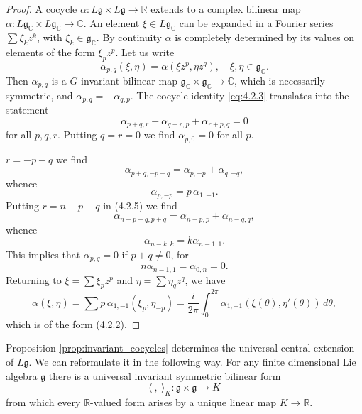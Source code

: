 \documentclass[12pt]{article}
\begin{document}
\begin{proof}
    A cocycle $\alpha : L\mathfrak{g} \times L\mathfrak{g} \to \mathbb{R}$
    extends to a complex bilinear map
    $\alpha : L\mathfrak{g}_{\mathbb{C}} \times L\mathfrak{g}_{\mathbb{C}} \to \mathbb{C}$.
    An element $\xi \in L\mathfrak{g}_{\mathbb{C}}$ can be expanded in a Fourier series
    $\sum \xi_k z^k$, with $\xi_k \in \mathfrak{g}_{\mathbb{C}}$. By continuity $\alpha$ is
    completely determined by its values on elements of the form $\xi_p z^p$.
    Let us write
    \[
        \alpha_{p,q}(\xi,\eta) = \alpha(\xi z^p, \eta z^q), \quad \xi,\eta \in \mathfrak{g}_{\mathbb{C}}.
    \]
    Then $\alpha_{p,q}$ is a $G$-invariant bilinear map
    $\mathfrak{g}_{\mathbb{C}} \times \mathfrak{g}_{\mathbb{C}} \to \mathbb{C}$, which is necessarily symmetric, and
    $\alpha_{p,q} = -\alpha_{q,p}$. The cocycle identity \eqref{eq:4.2.3} translates into the statement
    \begin{equation} \label{eq:4.2.5}
        \alpha_{p+q,r} + \alpha_{q+r,p} + \alpha_{r+p,q} = 0
    \end{equation}
    for all $p,q,r$. Putting $q=r=0$ we find $\alpha_{p,0}=0$ for all $p$.

    $r = -p-q$ we find
    \[
        \alpha_{p+q,-p-q} = \alpha_{p,-p} + \alpha_{q,-q},
    \]
    whence
    \[
        \alpha_{p,-p} = p \, \alpha_{1,-1}.
    \]
    Putting $r = n-p-q$ in (4.2.5) we find
    \[
        \alpha_{n-p-q,p+q} = \alpha_{n-p,p} + \alpha_{n-q,q},
    \]
    whence
    \[
        \alpha_{n-k,k} = k \alpha_{n-1,1}.
    \]
    This implies that $\alpha_{p,q} = 0$ if $p+q \neq 0$, for
    \[
        n\alpha_{n-1,1} = \alpha_{0,n} = 0.
    \]
    Returning to $\xi = \sum \xi_p z^p$ and $\eta = \sum \eta_q z^q$, we have
    \[
        \alpha(\xi,\eta) = \sum p \, \alpha_{1,-1}(\xi_p, \eta_{-p})
        = \frac{i}{2\pi} \int_0^{2\pi} \alpha_{1,-1}(\xi(\theta), \eta'(\theta))\, d\theta,
    \]
    which is of the form (4.2.2).
\end{proof}

Proposition \ref{prop:invariant_cocycles} determines the universal central extension of $L\mathfrak{g}$.
We can reformulate it in the following way. For any finite dimensional
Lie algebra $\mathfrak{g}$ there is a universal invariant symmetric bilinear form
\begin{equation} \label{eq:4.2.6}
    \langle \ , \ \rangle_K : \mathfrak{g} \times \mathfrak{g} \to K
\end{equation}
from which every $\mathbb{R}$-valued form arises by a unique linear map $K \to \mathbb{R}$.
\end{document}

